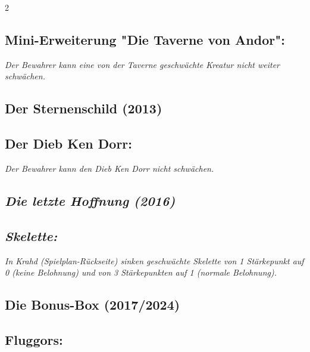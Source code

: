 \documentclass[10pt, a4paper, oneside]{book}
\newcommand{\fan}[1]{\textit{#1}}
\begin{document}
\begin{multicols*}{2}
\begin{bgcolor}
\subsection{Mini-Erweiterung "Die Taverne von Andor":} 

\fan{Der Bewahrer kann eine von der Taverne geschwächte Kreatur nicht weiter schwächen.}

\end{bgcolor}



\columnbreak

\begin{bgcolor}
\section{Der Sternenschild (2013)}

\subsection{Der Dieb Ken Dorr:}

\fan{Der Bewahrer kann den Dieb Ken Dorr nicht schwächen.}

\end{bgcolor}



\begin{bgcolor}
\section{\fan{Die letzte Hoffnung (2016)}}

\subsection{\fan{Skelette:}}


\fan{In Krahd (Spielplan-Rückseite) sinken geschwächte Skelette von 1 Stärkepunkt auf 0 (keine Belohnung) und von 3 Stärkepunkten auf 1 (normale Belohnung).}

\end{bgcolor}



\begin{bgcolor}[color-BB]
\section{Die Bonus-Box (2017/2024)}

\subsection{Fluggors:}


\end{bgcolor}
\end{multicols*}
\end{document}
